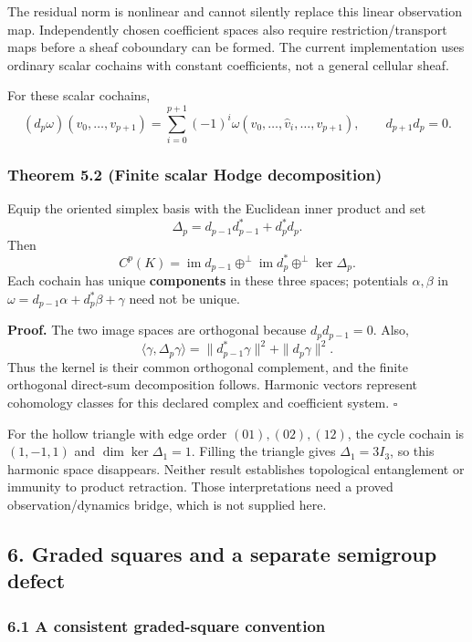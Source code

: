\documentclass[
  11pt,
]{article}
\begin{document}
The residual norm is nonlinear and cannot silently replace this linear
observation map. Independently chosen coefficient spaces also require
restriction/transport maps before a sheaf coboundary can be formed.
The current implementation uses ordinary scalar cochains with constant
coefficients, not a general cellular sheaf.

For these scalar cochains,
\[
(d_p\omega)(v_0,\ldots,v_{p+1})
 =\sum_{i=0}^{p+1}(-1)^i
 \omega(v_0,\ldots,\widehat v_i,\ldots,v_{p+1}),\qquad
d_{p+1}d_p=0.
\]

\subsubsection{Theorem 5.2 (Finite scalar Hodge decomposition)}\label{theorem-5.2-finite-scalar-hodge-decomposition}

Equip the oriented simplex basis with the Euclidean inner product and set
\[
\Delta_p=d_{p-1}d_{p-1}^*+d_p^*d_p.
\]
Then
\[
C^p(K)=\operatorname{im}d_{p-1}
 \mathbin{\oplus^\perp}\operatorname{im}d_p^*
 \mathbin{\oplus^\perp}\ker\Delta_p.
\]
Each cochain has unique \textbf{components} in these three spaces; potentials
\(\alpha,\beta\) in
\(\omega=d_{p-1}\alpha+d_p^*\beta+\gamma\) need not be unique.

\textbf{Proof.} The two image spaces are orthogonal because
\(d_pd_{p-1}=0\). Also,
\[
\langle\gamma,\Delta_p\gamma\rangle
 =\|d_{p-1}^*\gamma\|^2+\|d_p\gamma\|^2.
\]
Thus the kernel is their common orthogonal complement, and the finite
orthogonal direct-sum decomposition follows. Harmonic vectors represent
cohomology classes for this declared complex and coefficient system. \(\square\)

For the hollow triangle with edge order
\((01),(02),(12)\), the cycle cochain is \((1,-1,1)\) and
\(\dim\ker\Delta_1=1\). Filling the triangle gives
\(\Delta_1=3I_3\), so this harmonic space disappears.
Neither result establishes topological entanglement or immunity to product
retraction. Those interpretations need a proved observation/dynamics bridge,
which is not supplied here.

\subsection{6. Graded squares and a separate semigroup defect}\label{graded-squares-and-a-separate-semigroup-defect}

\subsubsection{6.1 A consistent graded-square convention}\label{a-consistent-graded-square-convention}
\end{document}
